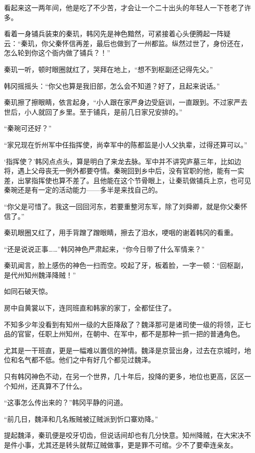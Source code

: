 看起来这一两年间，他是吃了不少苦，才会让一个二十出头的年轻人一下苍老了许多。

看着一身铺兵装束的秦玑，韩冈先是神色黯然，可紧接着心头便腾起一阵疑云：“秦玑，你父秦怀信再差，最后也做到了一州都监。纵然过世了，身份还在，怎么轮到你这个衙内做了铺兵？！”

秦玑一听，顿时眼圈就红了，哭拜在地上，“想不到枢副还记得先父。”

韩冈摇摇头：“你父也算是我旧部，怎么会不知道？好了，且起来说话。”

秦玑擦了擦眼睛，依言起身，“小人跟在家严身边受庭训，一直跟到。不过家严去世后，小人就回了乡里。至于铺兵，是前几日家兄安排的。”

“秦琬可还好？”

“家兄现在忻州军中任指挥使，尚幸军中的陈都监是小人父执辈，过得还算可以。”

‘指挥使？’韩冈点点头，算是明白了来龙去脉。军中并不讲究庐墓三年，比如边将，遇上父母丧无一例外都要夺情。秦琬回到乡中后，没有官职的他，能有一实差，出掌指挥使也算不差了。且他能在这个节骨眼上，让秦玑做铺兵上京，也可见秦琬还是有一定的活动能力——多半是来找自己的。

“你父是可惜了。我这一回回河东，若要重整河东军，除了刘舜卿，就是你父秦怀信了。”

秦玑眼圈又红了，用手背蹭了蹭眼睛，擦去了泪水，哽咽的谢着韩冈的看重。

“还是说说正事……”韩冈神色严肃起来，“你今日带了什么军情来？”

秦玑闻言，脸上感伤的神色一扫而空。咬起了牙，板着脸，一字一顿：“回枢副，是代州知州魏泽降贼！”

如同石破天惊。

房中自黄裳以下，连同班直和韩家的家丁，全都怔住了。

不知多少年没看到有知州一级的大臣降敌了？魏泽那可是诸司使一级的将领，正七品的官宦，任职上州知州，在朝中、在军中，都不是那种一抓一把的普通角色。

尤其是一干班直，更是一幅难以置信的神情。魏泽是京营出身，过去在京城时，地位和名气都不低。他们之中有好几个都见过魏泽。

只有韩冈神色不动，在另一个世界，几十年后，投降的更多，地位也更高，区区一个知州，还真算不了什么。

“这事怎么传出来的？”韩冈平静的问道。

“前几日，魏泽和几名叛贼被辽贼派到忻口寨劝降。”

提起魏泽，秦玑便是咬牙切齿，但说话间却也有几分快意。知州降贼，在大宋决不是件小事，尤其还是转头就帮辽贼做事，更是罪不可绾。少不了要牵连亲友。

